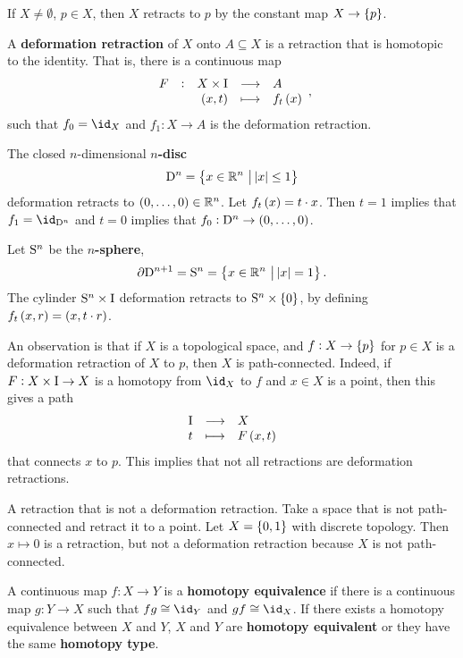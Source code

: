 \begin{example*}
If $ X \ne \emptyset $, $ p \in X $, then $ X $ retracts to $ p $ by the constant map $ X \to \cbr{p} $.
\end{example*}

\begin{definition*}
A \textbf{deformation retraction} of $ X $ onto $ A \subseteq X $ is a retraction that is homotopic to the identity. That is, there is a continuous map
$$ \function[F]{X \times \I}{A}{\br{x, t}}{f_t\br{x}}, $$
such that $ f_0 = \id_X $ and $ f_1 : X \to A $ is the deformation retraction.
\end{definition*}

\begin{example*}
The closed $ n $-dimensional \textbf{$ n $-disc}
$$ \D^n = \cbr{x \in \RR^n \st \abs{x} \le 1} $$
deformation retracts to $ \br{0, \dots, 0} \in \RR^n $. Let $ f_t\br{x} = t \cdot x $. Then $ t = 1 $ implies that $ f_1 = \id_{\D^n} $ and $ t = 0 $ implies that $ f_0 : \D^n \to \br{0, \dots, 0} $.
\end{example*}

\pagebreak

\begin{example*}
Let $ \S^n $ be the \textbf{$ n $-sphere},
$$ \partial \D^{n + 1} = \S^n = \cbr{x \in \RR^n \st \abs{x} = 1}. $$
The cylinder $ \S^n \times \I $ deformation retracts to $ \S^n \times \cbr{0} $, by defining $ f_t\br{x, r} = \br{x, t \cdot r} $.
\end{example*}

An observation is that if $ X $ is a topological space, and $ f : X \to \cbr{p} $ for $ p \in X $ is a deformation retraction of $ X $ to $ p $, then $ X $ is path-connected. Indeed, if $ F : X \times \I \to X $ is a homotopy from $ \id_X $ to $ f $ and $ x \in X $ is a point, then this gives a path
$$ \function{\I}{X}{t}{F\br{x, t}} $$
that connects $ x $ to $ p $. This implies that not all retractions are deformation retractions.

\begin{example*}
A retraction that is not a deformation retraction. Take a space that is not path-connected and retract it to a point. Let $ X = \cbr{0, 1} $ with discrete topology. Then $ x \mapsto 0 $ is a retraction, but not a deformation retraction because $ X $ is not path-connected.
\end{example*}

\begin{definition*}
A continuous map $ f : X \to Y $ is a \textbf{homotopy equivalence} if there is a continuous map $ g : Y \to X $ such that $ fg \cong \id_Y $ and $ gf \cong \id_X $. If there exists a homotopy equivalence between $ X $ and $ Y $, $ X $ and $ Y $ are \textbf{homotopy equivalent} or they have the same \textbf{homotopy type}.
\end{definition*}

